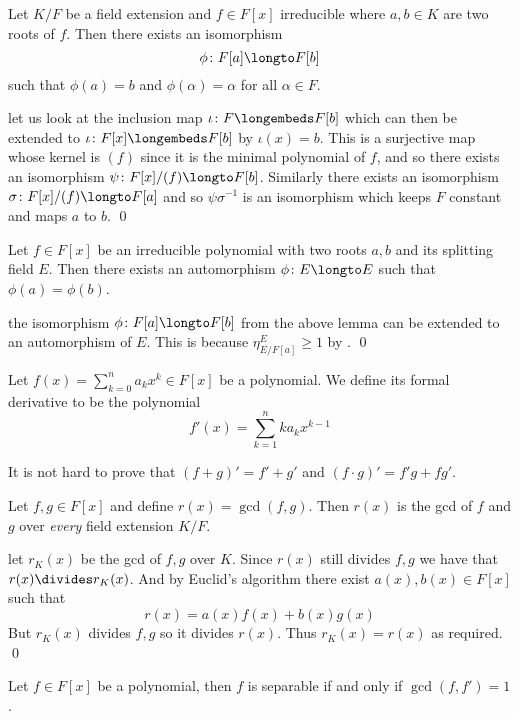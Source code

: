 \blemm

    Let $K/F$ be a field extension and $f\in F[x]$ irreducible where $a,b\in K$ are two roots of $f$.
    Then there exists an isomorphism
    $$ \phi\colon F[a]\longto F[b] $$
    such that $\phi(a)=b$ and $\phi(\alpha)=\alpha$ for all $\alpha\in F$.

\elemm

\Proof let us look at the inclusion map $\iota\colon F\longembeds F[b]$ which can then be extended to $\iota\colon F[x]\longembeds F[b]$ by $\iota(x)=b$.
This is a surjective map whose kernel is $(f)$ since it is the minimal polynomial of $f$, and so there exists an isomorphism $\psi\colon F[x]/(f)\longto F[b]$.
Similarly there exists an isomorphism $\sigma\colon F[x]/(f)\longto F[a]$ and so $\psi\sigma^{-1}$ is an isomorphism which keeps $F$ constant and maps $a$ to $b$.
\qed

\bprop[name=rootmap]

    Let $f\in F[x]$ be an irreducible polynomial with two roots $a,b$ and its splitting field $E$.
    Then there exists an automorphism $\phi\colon E\longto E$ such that $\phi(a)=\phi(b)$.

\eprop

\Proof the isomorphism $\phi\colon F[a]\longto F[b]$ from the above lemma can be extended to an automorphism of $E$.
This is because $\eta_{E/F[a]}^E\geq1$ by .
\qed

\bdefn

    Let $f(x)=\sum_{k=0}^na_kx^k\in F[x]$ be a polynomial.
    We define its {\emphcolor formal derivative} to be the polynomial
    $$ f'(x) = \sum_{k=1}^nka_kx^{k-1} $$

\edefn

It is not hard to prove that $(f+g)'=f'+g'$ and $(f\cdot g)'=f'g+fg'$.

\blemm

    Let $f,g\in F[x]$ and define $r(x)=\gcd(f,g)$.
    Then $r(x)$ is the gcd of $f$ and $g$ over {\it every} field extension $K/F$.

\elemm

\Proof let $r_K(x)$ be the gcd of $f,g$ over $K$.
Since $r(x)$ still divides $f,g$ we have that $r(x)\divides r_K(x)$.
And by Euclid's algorithm there exist $a(x),b(x)\in F[x]$ such that
$$ r(x) = a(x)f(x) + b(x)g(x) $$
But $r_K(x)$ divides $f,g$ so it divides $r(x)$.
Thus $r_K(x)=r(x)$ as required.
\qed

\bthrm[name=derivsep]

    Let $f\in F[x]$ be a polynomial, then $f$ is separable if and only if $\gcd(f,f')=1$.

